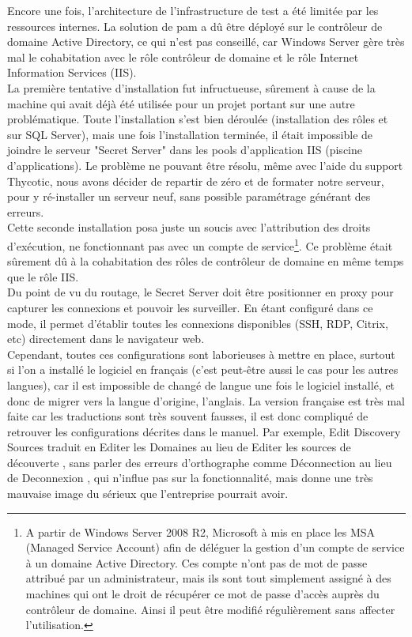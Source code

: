Encore une fois, l'architecture de l'infrastructure de test a été limitée par les ressources internes. La solution de \gls{pam} a dû être déployé sur le contrôleur de domaine Active Directory, ce qui n'est pas conseillé, car Windows Server gère très mal le cohabitation avec le rôle contrôleur de domaine et le rôle Internet Information Services (IIS).\\
La première tentative d'installation fut infructueuse, sûrement à cause de la machine qui avait déjà été utilisée pour un projet portant sur une autre problématique. Toute l'installation s'est bien déroulée (installation des rôles et sur SQL Server), mais une fois l'installation terminée, il était impossible de joindre le serveur "Secret Server" dans les pools d'application IIS (piscine d'applications). Le problème ne pouvant être résolu, même avec l'aide du support Thycotic, nous avons décider de repartir de zéro et de formater notre serveur, pour y ré-installer un serveur neuf, sans possible paramétrage générant des erreurs.\\
Cette seconde installation posa juste un soucis avec l'attribution des droits d'exécution, ne fonctionnant pas avec un compte de service\footnote{A partir de Windows Server 2008 R2, Microsoft à mis en place les MSA (Managed Service Account) afin de déléguer la gestion d'un compte de service à un domaine Active Directory. Ces compte n'ont pas de mot de passe attribué par un administrateur, mais ils sont tout simplement assigné à des machines qui ont le droit de récupérer ce mot de passe d'accès auprès du contrôleur de domaine. Ainsi il peut être modifié régulièrement sans affecter l'utilisation.}. Ce problème était sûrement dû à la cohabitation des rôles de contrôleur de domaine en même temps que le rôle IIS.\\
Du point de vu du routage, le Secret Server doit être positionner en proxy pour capturer les connexions et pouvoir les surveiller. En étant configuré dans ce mode, il permet d'établir toutes les connexions disponibles (SSH, RDP, Citrix, etc) directement dans le navigateur web.\\
Cependant, toutes ces configurations sont laborieuses à mettre en place, surtout si l'on a installé le logiciel en français (c'est peut-être aussi le cas pour les autres langues), car il est impossible de changé de langue une fois le logiciel installé, et donc de migrer vers la langue d'origine, l'anglais. La version française est très mal faite car les traductions sont très souvent fausses, il est donc compliqué de retrouver les configurations décrites dans le manuel. Par exemple, \og Edit Discovery Sources \fg{} traduit en \og Editer les Domaines \fg{} au lieu de \og Editer les sources de découverte \fg{}, sans parler des erreurs d'orthographe comme \og Déconnection \fg{} au lieu de \og Deconnexion \fg{}, qui n'influe pas sur la fonctionnalité, mais donne une très mauvaise image du sérieux que l'entreprise pourrait avoir.

